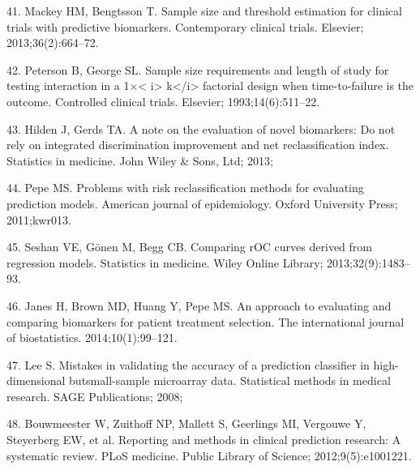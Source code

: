 \documentclass[11pt]{article}
\begin{document}
41. Mackey HM, Bengtsson T. Sample size and threshold estimation for
clinical trials with predictive biomarkers. Contemporary clinical
trials. Elsevier; 2013;36(2):664--72.

42. Peterson B, George SL. Sample size requirements and length of study
for testing interaction in a 1\(\times\)\textless{} i\textgreater{}
k\textless{}/i\textgreater{} factorial design when time-to-failure is
the outcome. Controlled clinical trials. Elsevier; 1993;14(6):511--22.

43. Hilden J, Gerds TA. A note on the evaluation of novel biomarkers: Do
not rely on integrated discrimination improvement and net
reclassification index. Statistics in medicine. John Wiley \& Sons, Ltd;
2013;

44. Pepe MS. Problems with risk reclassification methods for evaluating
prediction models. American journal of epidemiology. Oxford University
Press; 2011;kwr013.

45. Seshan VE, G{ö}nen M, Begg CB. Comparing rOC curves derived from
regression models. Statistics in medicine. Wiley Online Library;
2013;32(9):1483--93.

46. Janes H, Brown MD, Huang Y, Pepe MS. An approach to evaluating and
comparing biomarkers for patient treatment selection. The international
journal of biostatistics. 2014;10(1):99--121.

47. Lee S. Mistakes in validating the accuracy of a prediction
classifier in high-dimensional butsmall-sample microarray data.
Statistical methods in medical research. SAGE Publications; 2008;

48. Bouwmeester W, Zuithoff NP, Mallett S, Geerlings MI, Vergouwe Y,
Steyerberg EW, et al. Reporting and methods in clinical prediction
research: A systematic review. PLoS medicine. Public Library of Science;
2012;9(5):e1001221.
\end{document}
